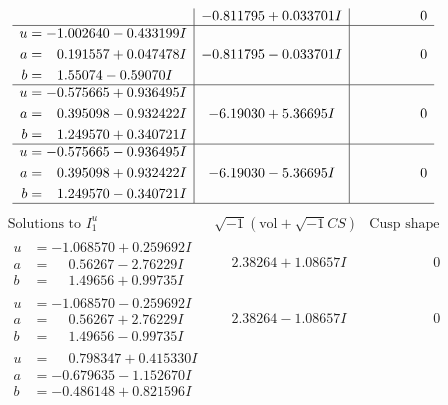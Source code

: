 \documentclass[1p]{elsarticle_modified}
\theoremstyle{definition}
\newcommand{\I}{\sqrt{-1}}
\begin{document}
$$\begin{array}{c|c|c}
 & -0.811795 + 0.033701 I & \phantom{-0.000000 } 0 \\ \hline\begin{aligned}
u &= -1.002640 - 0.433199 I \\
a &= \phantom{-}0.191557 + 0.047478 I \\
b &= \phantom{-}1.55074 - 0.59070 I\end{aligned}
 & -0.811795 - 0.033701 I & \phantom{-0.000000 } 0 \\ \hline\begin{aligned}
u &= -0.575665 + 0.936495 I \\
a &= \phantom{-}0.395098 - 0.932422 I \\
b &= \phantom{-}1.249570 + 0.340721 I\end{aligned}
 & -6.19030 + 5.36695 I & \phantom{-0.000000 } 0 \\ \hline\begin{aligned}
u &= -0.575665 - 0.936495 I \\
a &= \phantom{-}0.395098 + 0.932422 I \\
b &= \phantom{-}1.249570 - 0.340721 I\end{aligned}
 & -6.19030 - 5.36695 I & \phantom{-0.000000 } 0\\
 \hline 
 \end{array}$$\newpage$$\begin{array}{c|c|c}  
\text{Solutions to }I^u_{1}& \I (\text{vol} + \sqrt{-1}CS) & \text{Cusp shape}\\
 \hline 
\begin{aligned}
u &= -1.068570 + 0.259692 I \\
a &= \phantom{-}0.56267 - 2.76229 I \\
b &= \phantom{-}1.49656 + 0.99735 I\end{aligned}
 & \phantom{-}2.38264 + 1.08657 I & \phantom{-0.000000 } 0 \\ \hline\begin{aligned}
u &= -1.068570 - 0.259692 I \\
a &= \phantom{-}0.56267 + 2.76229 I \\
b &= \phantom{-}1.49656 - 0.99735 I\end{aligned}
 & \phantom{-}2.38264 - 1.08657 I & \phantom{-0.000000 } 0 \\ \hline\begin{aligned}
u &= \phantom{-}0.798347 + 0.415330 I \\
a &= -0.679635 - 1.152670 I \\
b &= -0.486148 + 0.821596 I\end{aligned}

\end{array}$$
\end{document}
